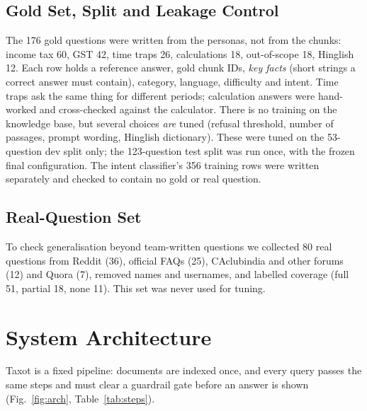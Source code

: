 \documentclass[conference]{IEEEtran}
\begin{document}
\subsection{Gold Set, Split and Leakage Control}
The 176 gold questions were written from the personas, not from the chunks: income tax 60, GST 42, time
traps 26, calculations 18, out-of-scope 18, Hinglish 12. Each row holds a reference answer, gold chunk IDs,
\emph{key facts} (short strings a correct answer must contain), category, language, difficulty and intent.
Time traps ask the same thing for different periods; calculation answers were hand-worked and cross-checked
against the calculator. There is no training on the knowledge base, but several choices \emph{are} tuned
(refusal threshold, number of passages, prompt wording, Hinglish dictionary). These were tuned on the 53-question
dev split only; the 123-question test split was run once, with the frozen final configuration. The intent
classifier's 356 training rows were written separately and checked to contain no gold or real question.

\subsection{Real-Question Set}
To check generalisation beyond team-written questions we collected 80 real questions from Reddit (36),
official FAQs (25), CAclubindia and other forums (12) and Quora (7), removed names and usernames, and
labelled coverage (full 51, partial 18, none 11). This set was never used for tuning.

\section{System Architecture}

Taxot is a fixed pipeline: documents are indexed once, and every query passes the same steps and must clear
a guardrail gate before an answer is shown (Fig.~\ref{fig:arch}, Table~\ref{tab:steps}).
\end{document}
